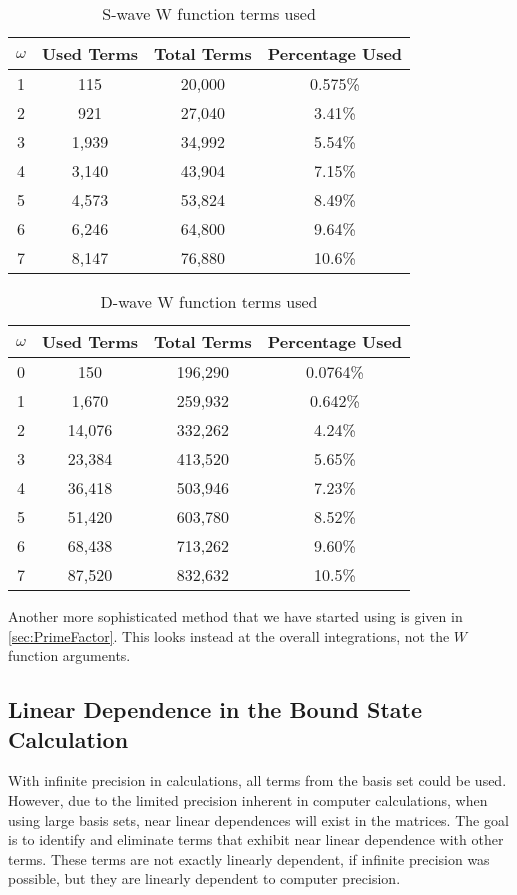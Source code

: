 \documentclass[Dissertation.tex]{subfiles}
\begin{document}
\begin{table}
\centering
\begin{tabular}{c c c c}
\toprule
$\omega$ & Used Terms & Total Terms & Percentage Used \\
\midrule
1 & 	115   &  20,000 & 	0.575\% \\
2 & 	921   &  27,040 & 	3.41\% \\
3 & 	1,939 &  34,992 & 	5.54\% \\
4 & 	3,140 &  43,904 & 	7.15\% \\
5 & 	4,573 &  53,824 &	8.49\% \\
6 & 	6,246 &  64,800 &	9.64\% \\
7 & 	8,147 &  76,880 &	10.6\% \\
\bottomrule
\end{tabular}
\caption{S-wave W function terms used}
\label{tab:WFuncUnusedS}
\end{table}

\begin{table}
\centering
\begin{tabular}{c c c c}
\toprule
$\omega$ & Used Terms & Total Terms & Percentage Used \\
\midrule
0 & 150		&	196,290 &	0.0764\% \\
1 & 1,670	&	259,932 &	0.642\% \\
2 & 14,076	&	332,262 &	4.24\% \\
3 & 23,384	&	413,520 &	5.65\% \\
4 & 36,418	&	503,946 &	7.23\% \\
5 & 51,420  &	603,780 &	8.52\% \\
6 & 68,438	&	713,262 &	9.60\% \\
7 & 87,520	&	832,632 &  10.5\% \\
\bottomrule
\end{tabular}
\caption{D-wave W function terms used}
\label{tab:WFuncUnusedD}
\end{table}

Another more sophisticated method that we have started using is given in
\cref{sec:PrimeFactor}. This looks instead at the overall integrations,
not the $W$ function arguments.



\subsection{Linear Dependence in the Bound State Calculation}
With infinite precision in calculations, all terms from the basis set could be used. However, due to the limited precision inherent in computer calculations, when using large basis sets, near linear dependences will exist in the matrices. The goal is to identify and eliminate terms that exhibit near linear dependence with other terms. These terms are not exactly linearly dependent, if infinite precision was possible, but they are linearly dependent to computer precision.
\end{document}
